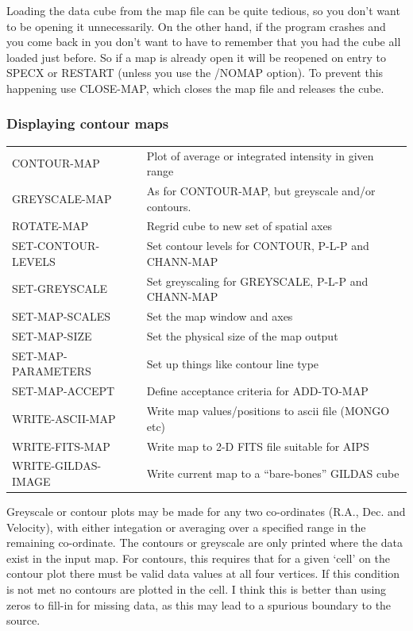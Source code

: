 \documentclass[11pt,twoside]{report}
\begin{document}
Loading the data cube from the map file can be quite tedious,  so you don't want to be opening it unnecessarily. On the other
hand, if the program crashes and you come back in you don't want to have to
remember that you had the cube all loaded just before. So if a map is already
open it will be reopened on entry to SPECX or RESTART (unless you use the
/NOMAP option).  To prevent this happening use CLOSE-MAP, which
closes the map file and releases the cube. 

\subsubsection{Displaying contour maps}

\begin{tabular}{ll}
CONTOUR-MAP             & Plot of average or integrated intensity in given
                          range\\
GREYSCALE-MAP           & As for CONTOUR-MAP, but greyscale and/or contours.\\
ROTATE-MAP              & Regrid cube to new set of spatial axes\\
SET-CONTOUR-LEVELS      & Set contour levels for CONTOUR,
                          P-L-P and CHANN-MAP\\
SET-GREYSCALE           & Set greyscaling for GREYSCALE,
                          P-L-P and CHANN-MAP\\
SET-MAP-SCALES          & Set the map window and axes\\
SET-MAP-SIZE            & Set the physical size of the map output\\
SET-MAP-PARAMETERS      & Set up things like contour line type\\
SET-MAP-ACCEPT          & Define acceptance criteria for ADD-TO-MAP\\
WRITE-ASCII-MAP         & Write map values/positions to ascii file (MONGO etc)\\
WRITE-FITS-MAP          & Write map to 2-D FITS file suitable for AIPS\\
WRITE-GILDAS-IMAGE      & Write current map to a ``bare-bones'' GILDAS cube
\end{tabular}

Greyscale  or contour plots 
 may be made for any two co-ordinates (R.A., Dec. and
Velocity), with either integation or averaging over a specified range in the
remaining co-ordinate. The contours or greyscale are only printed where the
data exist in the input map. For contours, this requires that for a given
`cell' on the contour plot there must be valid data values at all four
vertices. If this condition is not met no contours are plotted in the cell. I
think this is better than using zeros to fill-in for missing data, as this may
lead to a spurious boundary to the source.  
\end{document}
